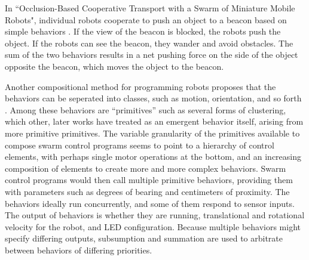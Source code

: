 \documentclass[]{article}
\begin{document}
In ``Occlusion-Based Cooperative Transport with a Swarm of Miniature Mobile Robots", individual robots cooperate to push an object to a beacon based on simple behaviors \cite{chen2015occlusion}. 
If the view of the beacon is blocked, the robots push the object. 
If the robots can see the beacon, they wander and avoid obstacles. 
The sum of the two behaviors results in a net pushing force on the side of the object opposite the beacon, which moves the object to the beacon. 

Another compositional method for programming robots proposes that the behaviors can be seperated into classes, such as motion, orientation, and so forth \cite{mclurkin2004stupid}. 
Among these behaviors are ``primitives'' such as several forms of clustering, which other, later works have treated as an emergent behavior itself, arising from more primitive primitives. 
The variable granularity of the primitives available to compose swarm control programs seems to point to a hierarchy of control elements, with perhaps single motor operations at the bottom, and an increasing composition of elements to create more and more complex behaviors.
Swarm control programs would then call multiple primitive behaviors, providing them with parameters such as degrees of bearing and centimeters of proximity. 
The behaviors ideally run concurrently, and some of them respond to sensor inputs. 
The output of behaviors is whether they are running, translational and rotational velocity for the robot, and LED configuration. 
Because multiple behaviors might specify differing outputs, subsumption and summation are used to arbitrate between behaviors of differing priorities. 
\end{document}
